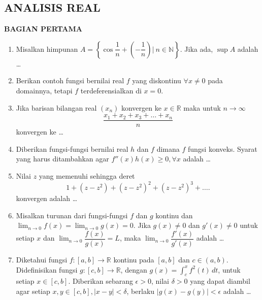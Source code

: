 \documentclass[12pt,twoside]{article}
\begin{document}
\subsection{ANALISIS REAL}
\textbf{BAGIAN PERTAMA}
\begin{enumerate}
	\item Misalkan himpunan $A = \left\lbrace \cos\dfrac{1}{n}+\left(-\dfrac{1}{n}\right) \bigg|~ n \in \mathbb{N} \right\rbrace$. Jika ada, $\sup A$ adalah \dots

	\item Berikan contoh fungsi bernilai real $f$ yang diskontinu $\forall x \neq 0$ pada domainnya, tetapi $f$ terdeferensialkan di $x=0$.

	\item Jika barisan bilangan real $(x_n)$ konvergen ke $x \in \mathbb{R} $ maka untuk $n \to \infty$
	      \begin{equation*}
		      \dfrac{x_1 + x_2 + x_3 +\dots+ x_n}{n}
	      \end{equation*}
	      konvergen ke \dots

	\item Diberikan fungsi-fungsi bernilai real $h$ dan $f$ dimana $f$ fungsi konveks. Syarat yang harus ditambahkan agar $f''(x)h(x) \geq 0, \forall x$ adalah \dots

	\item Nilai $z$ yang memenuhi sehingga deret
	      \begin{equation*}
		      1+(z-z^2)+(z-z^2)^2+(z-z^2)^3+\dots.
	      \end{equation*}
	      konvergen adalah \dots

	\item Misalkan turunan dari fungsi-fungsi $f$ dan $g$ kontinu dan $\displaystyle\lim_{n \to 0} f(x)=\displaystyle\lim_{n \to 0} g(x) = 0.$ Jika $g(x) \neq 0$ dan $g'(x) \neq 0$ untuk setiap $x$ dan $\displaystyle\lim_{n \to 0} \dfrac{f(x)}{g(x)} = L$, maka $\displaystyle\lim_{n \to 0} \dfrac{f'(x)}{g'(x)}$ adalah \dots

	\item Diketahui fungsi $f : \left[a,b\right] \to \mathbb{R}$ kontinu pada $\left[a,b\right]$ dan $c \in \left(a,b\right)$. Didefinisikan fungsi $g : \left[c,b\right] \to \mathbb{R}$, dengan $g(x) = \displaystyle\int_{c}^{x} f^2(t)\,dt$, untuk setiap $x \in \left[c,b\right]$. Diberikan sebarang $\epsilon >0$, nilai $\delta > 0$ yang dapat diambil agar setiap $x,y \in \left[c,b\right], |x-y| < \delta$, berlaku $|g(x)-g(y)|<\epsilon$ adalah \dots


\end{enumerate}
\end{document}

